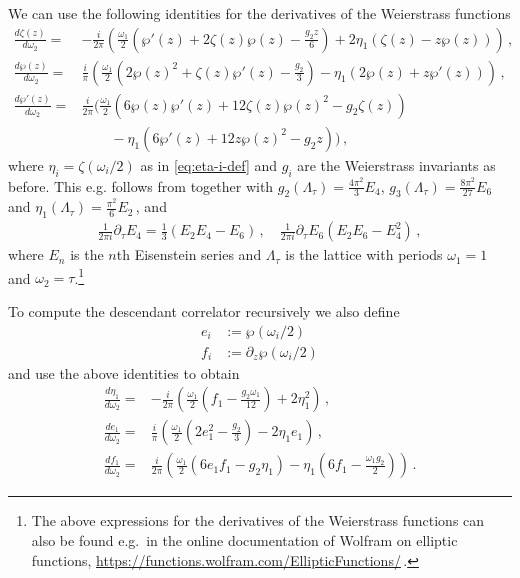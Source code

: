 \documentclass[11pt,a4paper]{article}
\numberwithin{equation}{section}
\begin{document}
We can use the following identities for the derivatives of the Weierstrass functions
\begin{align}
    \frac{d \zeta(z)}{d\omega_2} = & -\frac{i}{2\pi}  \left(\frac{\omega_1}{2}\left(\wp'(z) + 2 \zeta(z)\wp(z) - \frac{g_2 z}{6}\right) + 2\eta_1 \left(\zeta(z)-z\wp(z)\right) \right)\,,
    \nonumber\\
    \frac{d \wp(z)}{d\omega_2} = & \frac{i}{\pi}  \left(\frac{\omega_1}{2}\left(2\wp(z)^2 + \zeta(z)\wp'(z) - \frac{g_2}{3}\right) - \eta_1 \left(2\wp(z)+z\wp'(z)\right) \right)\,,
    \nonumber\\
    \frac{d\wp'(z)}{d\omega_2} = & \frac{i}{2\pi}  \Big( \frac{\omega_1}{2} \left(6 \wp(z) \wp'(z) + 12 \zeta(z)\wp(z)^2 -g_2 \zeta(z)\right)\nonumber\\
    & \phantom{-\frac{i}{2\pi}  \Big(}- \eta_1\left(6\wp'(z) +12 z \wp(z)^2 -g_2 z\right)\Big)\,,
\end{align}
%
where $\eta_i = \zeta(\omega_i/2)$ as in \eqref{eq:eta-i-def} and $g_i$ are the Weierstrass invariants as before. This e.g. follows from \cite[Eq.\,18.6.19--24]{Abramowitz:1970} together with $g_2(\Lambda_\tau) = \frac{4\pi^2}{3}E_4$, $g_3(\Lambda_\tau)= \frac{8\pi^2}{27}E_6$ and $\eta_1(\Lambda_\tau) = \frac{\pi^2}{6} E_2$\,, and \cite{Eichler:1982}
%
\begin{align}\label{eq:EisensteinDer}
    \frac{1}{2\pi i} \partial_\tau E_4 = \frac{1}{3} \left(E_2E_4-E_6\right)\,,\quad \frac{1}{2\pi i} \partial_\tau E_6 \left(E_2E_6-E_4^2\right)\,,
\end{align}
%
where $E_n$ is the $n$th Eisenstein series and $\Lambda_\tau$ is the lattice with periods $\omega_1=1$ and $\omega_2=\tau$.\footnote{
    The
above expressions for the derivatives of the Weierstrass functions can also be found 
    e.g.\ in 
the online documentation of Wolfram on elliptic functions, \url{https://functions.wolfram.com/EllipticFunctions/}\,.} 

To compute the descendant correlator recursively we also define 
%
\begin{align}
    e_i &:= \wp(\omega_i/2)
    \nonumber\\
    f_i &:= \partial_z\wp(\omega_i/2)
\end{align}
%
and use the above identities to obtain
%
\begin{align}
    \frac{d\eta_1}{d\omega_2} =& -\frac{i}{2\pi}  \left(\frac{\omega_1}{2}\left(f_1 - \frac{g_2 \omega_1}{12}\right) + 2\eta_1^2   \right)\,, 
    \nonumber\\
    \frac{de_1}{d\omega_2} =& \frac{i}{\pi}\left(\frac{\omega_1}{2}\left(2e_1^2 - \frac{g_2}{3}\right) - 2\eta_1 e_1 \right)\,,
    \nonumber\\
    \frac{df_1}{d\omega_2} = & \frac{i}{2\pi}  \left( \frac{\omega_1}{2} \left(6 e_1 f_1 -g_2 \eta_1\right)-\eta_1\left(6f_1 -\frac{\omega_1 g_2 }{2}\right)\right)\,.
\end{align}
\end{document}

